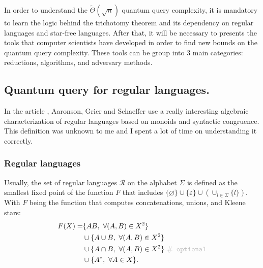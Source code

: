 In order to understand the $\tilde{\Theta}(\sqrt{n})$ quantum
query complexity, it is mandatory to learn the logic behind the
trichotomy theorem \cite{trichotomy_not_andris} and its dependency on regular
languages and star-free languages.
After that, it will be necessary to presents the tools
that computer scientists have developed in order to
find new bounds on the quantum query complexity.
These tools can be group into 3 main categories:
reductions, algorithms, and adversary methods\cite{adversary_equivalence}.

\subsection{Quantum query for regular languages.}

In the article \cite{trichotomy_not_andris}, Aaronson, Grier and Schaeffer use
a really interesting algebraic characterization of regular languages based on
monoids and syntactic congruence. This definition was unknown to me and I spent
a lot of time on understanding it correctly.

\subsubsection{Regular languages}

Usually, the set of regular languages $\mathcal{R}$ on the alphabet $\Sigma$ is
defined as the smallest fixed point of the function $F$ that includes $\{\varnothing\} \cup
    \{\varepsilon\} \cup(\cup_{l\in\Sigma}\{l\})$. With $F$ being the function that computes
concatenations, unions, and Kleene stars:
\begin{align*}\label{eq:F}
    F(X) = & \{AB,\  \forall (A,B)\in X^2\}                                                   \\
           & \cup \{A\cup B,\ \forall (A,B) \in X^2 \}                                        \\
           & \cup \{A\cap B,\ \forall (A,B) \in X^2 \}\ \texttt{\color{gray!50}$\#$ optional} \\
           & \cup \{A^*,\ \forall A \in X \}.
\end{align*}

